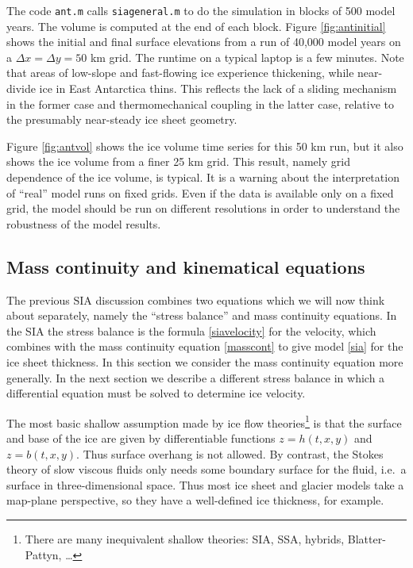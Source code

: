 \documentclass[titlepage,letterpaper,final,12pt]{scrartcl}
\begin{document}
The code \texttt{ant.m} calls \texttt{siageneral.m} to do the simulation in blocks of 500 model years.  The volume is computed at the end of each block.  Figure \ref{fig:antinitial} shows the initial and final surface elevations from a run of 40,000 model years on a $\Delta x = \Delta y = 50$ km grid.  The runtime on a typical laptop is a few minutes.  Note that areas of low-slope and fast-flowing ice experience thickening, while near-divide ice in East Antarctica thins.  This reflects the lack of a sliding mechanism in the former case and thermomechanical coupling in the latter case, relative to the presumably near-steady ice sheet geometry.

Figure \ref{fig:antvol} shows the ice volume time series for this 50 km run, but it also shows the ice volume from a finer 25 km grid.  This result, namely grid dependence of the ice volume, is typical.  It is a warning about the interpretation of ``real'' model runs on fixed grids.  Even if the data is available only on a fixed grid, the model should be run on different resolutions in order to understand the robustness of the model results.


\subsection{Mass continuity and kinematical equations}

The previous SIA discussion combines two equations which we will now think about separately, namely the ``stress balance'' and mass continuity equations.  In the SIA the stress balance is the formula \eqref{siavelocity} for the velocity, which combines with the mass continuity equation \eqref{masscont} to give model \eqref{sia} for the ice sheet thickness.  In this section we consider the mass continuity equation more generally.  In the next section we describe a different stress balance in which a differential equation must be solved to determine ice velocity.

The most basic shallow assumption made by ice flow theories\footnote{There are many inequivalent shallow theories: SIA, SSA, hybrids, Blatter-Pattyn, \dots} is that the surface and base of the ice are given by differentiable functions $z=h(t,x,y)$ and $z=b(t,x,y)$.  Thus surface overhang is not allowed.  By contrast, the Stokes theory of slow viscous fluids only needs some boundary surface for the fluid, i.e.~a surface in three-dimensional space.  Thus most ice sheet and glacier models take a map-plane perspective, so they have a well-defined ice thickness, for example.
\end{document}
